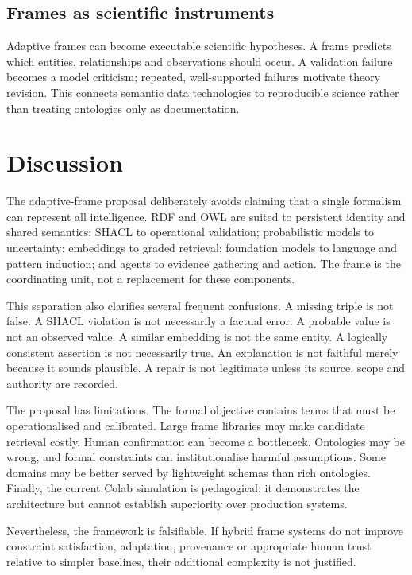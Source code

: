 \documentclass[11pt,a4paper]{article}
\begin{document}
\subsection{Frames as scientific instruments}

Adaptive frames can become executable scientific hypotheses. A frame predicts
which entities, relationships and observations should occur. A validation
failure becomes a model criticism; repeated, well-supported failures motivate
theory revision. This connects semantic data technologies to reproducible
science rather than treating ontologies only as documentation.

\section{Discussion}

The adaptive-frame proposal deliberately avoids claiming that a single formalism
can represent all intelligence. RDF and OWL are suited to persistent identity
and shared semantics; SHACL to operational validation; probabilistic models to
uncertainty; embeddings to graded retrieval; foundation models to language and
pattern induction; and agents to evidence gathering and action. The frame is
the coordinating unit, not a replacement for these components.

This separation also clarifies several frequent confusions. A missing triple is
not false. A SHACL violation is not necessarily a factual error. A probable
value is not an observed value. A similar embedding is not the same entity. A
logically consistent assertion is not necessarily true. An explanation is not
faithful merely because it sounds plausible. A repair is not legitimate unless
its source, scope and authority are recorded.

The proposal has limitations. The formal objective contains terms that must be
operationalised and calibrated. Large frame libraries may make candidate
retrieval costly. Human confirmation can become a bottleneck. Ontologies may be
wrong, and formal constraints can institutionalise harmful assumptions. Some
domains may be better served by lightweight schemas than rich ontologies.
Finally, the current Colab simulation is pedagogical; it demonstrates the
architecture but cannot establish superiority over production systems.

Nevertheless, the framework is falsifiable. If hybrid frame systems do not
improve constraint satisfaction, adaptation, provenance or appropriate human
trust relative to simpler baselines, their additional complexity is not
justified.
\end{document}
